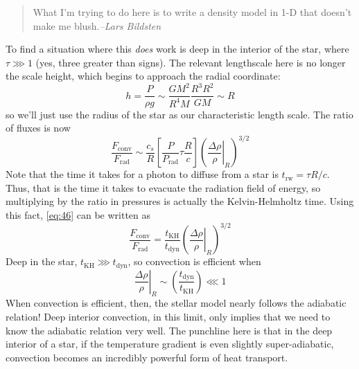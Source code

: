 \documentclass[10pt]{article}
\numberwithin{equation}{section}
\begin{document}
  \begin{quote}
    What I'm trying to do here is to write a density model in 1-D that
    doesn't make me blush.\hfill \emph{--Lars Bildsten}
  \end{quote}
  To find a situation where this \emph{does} work is deep in the
  interior of the star, where $\tau \ggg 1$ (yes, three greater than
  signs). The relevant lengthscale here is no longer the scale height,
  which begins to approach the radial coordinate:
  \begin{equation}
    \label{eq:45}
    h=\frac{P}{\rho g}\sim\frac{GM^2}{R^4M}\frac{R^3R^2}{GM}\sim R
  \end{equation}
  so we'll just use the radius of the star as our characteristic
  length scale. The ratio of fluxes is now 
  \begin{equation}
    \label{eq:46}
    \frac{F_{\mathrm{conv}}}{F_{\mathrm{rad}}}\sim \frac{c_s}{R}\left[\frac
{P}{P_{\mathrm{rad}}}\tau\frac{R}{c}\right]\left(\left.\frac{\Delta\rho}
{\rho}\right|_{R}\right)^{3/2}
  \end{equation}
  Note that the time it takes for a photon to diffuse from a star is
  $t_{\mathrm{rw}}=\tau R/c$. Thus, that is the time it takes to
  evacuate the radiation field of energy, so multiplying by the ratio
  in pressures is actually the Kelvin-Helmholtz time. Using this fact,
  \eqref{eq:46} can be written as
  \begin{equation}
    \label{eq:47}
    \frac{F_{\mathrm{conv}}}{F_{\mathrm{rad}}}=\frac{t_{\mathrm{KH}}}{t_
{\mathrm{dyn}}}\left(\left.\frac{\Delta\rho}{\rho}\right|_{R}\right)^{3/2}
  \end{equation}
  Deep in the star, $t_{\mathrm{KH}}\ggg t_{\mathrm{dyn}}$, so
  convection is efficient when
  \begin{equation}
    \label{eq:48}
    \left.\frac{\Delta\rho}{\rho}\right|_R\sim\left(\frac{t_{\mathrm{dyn}}}
{t_{\mathrm{KH}}}\right)\lll 1
  \end{equation}
  When convection is efficient, then, the stellar model nearly follows
  the adiabatic relation! Deep interior convection, in this limit,
  only implies that we need to know the adiabatic relation very
  well. The punchline here is that in the deep interior of a star, if
  the temperature gradient is even slightly super-adiabatic,
  convection becomes an incredibly powerful form of heat transport.\\
\end{document}
